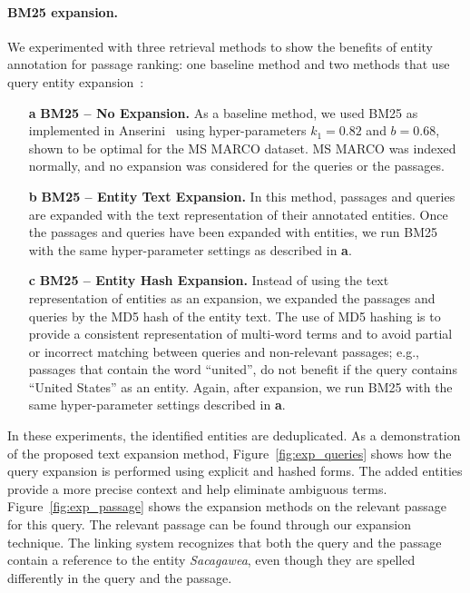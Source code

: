 \paragraph{BM25 expansion.} We experimented with three retrieval methods to show the benefits of entity annotation for passage ranking: one baseline method and two methods that use query entity expansion~\citep{Shehata}:

\begin{itemize}
	\item[\textbf{a}] \textbf{BM25 -- No Expansion.} As a baseline method, we used BM25 as implemented in Anserini~\cite{Kamphuis2020BM25} using hyper-parameters $k_1=0.82$ and $b=0.68$, shown to be optimal for the MS MARCO dataset. MS MARCO was indexed normally, and no expansion was considered for the queries or the passages. 
	\item[\textbf{b}] \textbf{BM25 -- Entity Text Expansion.} In this method, passages and queries are expanded with the text representation of their annotated entities. Once the passages and queries have been expanded with entities, we run BM25 with the same hyper-parameter settings as described in \textbf{a}.
	\item[\textbf{c}] \textbf{BM25 -- Entity Hash Expansion.} Instead of using the text representation of entities as an expansion, we expanded the passages and queries by the MD5 hash of the entity text. The use of MD5 hashing is to provide a consistent representation of multi-word terms and to avoid partial or incorrect matching between queries and non-relevant passages; e.g., passages that contain the word ``united'', do not benefit if the query contains ``United States'' as an entity. Again, after expansion, we run BM25 with the same hyper-parameter settings described in \textbf{a}.
\end{itemize}
In these experiments, the identified entities are deduplicated. As a demonstration of the proposed text expansion method, Figure~\ref{fig:exp_queries} shows how the query expansion is performed using explicit and hashed forms. The added entities provide a more precise context and help eliminate ambiguous terms. Figure~\ref{fig:exp_passage} shows the expansion methods on the relevant passage for this query. The relevant passage can be found through our expansion technique. The linking system recognizes that both the query and the passage contain a reference to the entity \emph{Sacagawea}, even though they are spelled differently in the query and the passage.

